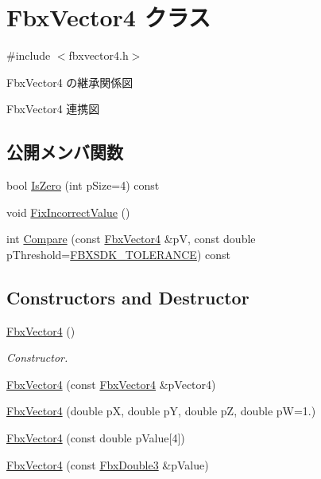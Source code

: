 \hypertarget{class_fbx_vector4}{}\section{Fbx\+Vector4 クラス}
\label{class_fbx_vector4}


{\ttfamily \#include $<$fbxvector4.\+h$>$}



Fbx\+Vector4 の継承関係図


Fbx\+Vector4 連携図
\subsection*{公開メンバ関数}
\begin{DoxyCompactItemize}
\item 
bool \hyperlink{class_fbx_vector4_ad64896518153da4f6c72b8d75082c8f3}{Is\+Zero} (int p\+Size=4) const
\item 
void \hyperlink{class_fbx_vector4_adb1810b99d85ab324cfe837fb286dcd2}{Fix\+Incorrect\+Value} ()
\item 
int \hyperlink{class_fbx_vector4_a018a38c6e19a1709ddab74e78f5c2a0b}{Compare} (const \hyperlink{class_fbx_vector4}{Fbx\+Vector4} \&pV, const double p\+Threshold=\hyperlink{fbxtypes_8h_acf3cd6f208edb42ad9c9abbc1f7feea0}{F\+B\+X\+S\+D\+K\+\_\+\+T\+O\+L\+E\+R\+A\+N\+CE}) const
\end{DoxyCompactItemize}
\subsection*{Constructors and Destructor}
\begin{DoxyCompactItemize}
\item 
\hyperlink{class_fbx_vector4_af346570e3050b36bf11a1cf3d162ed4e}{Fbx\+Vector4} ()
\begin{DoxyCompactList}\small\item\em Constructor. \end{DoxyCompactList}\item 
\hyperlink{class_fbx_vector4_a87adf6b4cc9e6aa4b81e5067dd3d6102}{Fbx\+Vector4} (const \hyperlink{class_fbx_vector4}{Fbx\+Vector4} \&p\+Vector4)
\item 
\hyperlink{class_fbx_vector4_a123ea824d4d86519a5f047fa58adca1f}{Fbx\+Vector4} (double pX, double pY, double pZ, double pW=1.)
\item 
\hyperlink{class_fbx_vector4_aaf9d72c9d8930c93bec84e5272088aad}{Fbx\+Vector4} (const double p\+Value\mbox{[}4\mbox{]})
\item 
\hyperlink{class_fbx_vector4_a6f216a9046faeb73c5f54343d8be3374}{Fbx\+Vector4} (const \hyperlink{fbxtypes_8h_ae0a96f14cde566774c7553aa7523b7a7}{Fbx\+Double3} \&p\+Value)
\end{DoxyCompactItemize}
